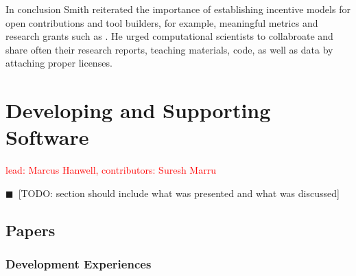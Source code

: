 \documentclass[11pt, oneside]{amsart}
\newcommand{\todo}[1]{{\color{blue}$\blacksquare$~\textsf{[TODO: #1]}}}
\newcommand{\note}[1]{ {\textcolor{red}    { #1 }}}
\begin{document}
In conclusion Smith reiterated the importance of establishing
incentive models for open contributions and tool builders, for
example, meaningful metrics and research grants such as
\cite{NSF_software_vision}. He urged computational scientists to
collabroate and share often their research reports, teaching
materials, code, as well as data by attaching proper licenses.

\section{Developing and Supporting Software} \label{sec:devel}

\note{lead: Marcus Hanwell, contributors: Suresh Marru}

\todo{section should include what was presented and what was discussed}

\subsection{Papers}

\subsubsection*{Development Experiences}
\end{document}
